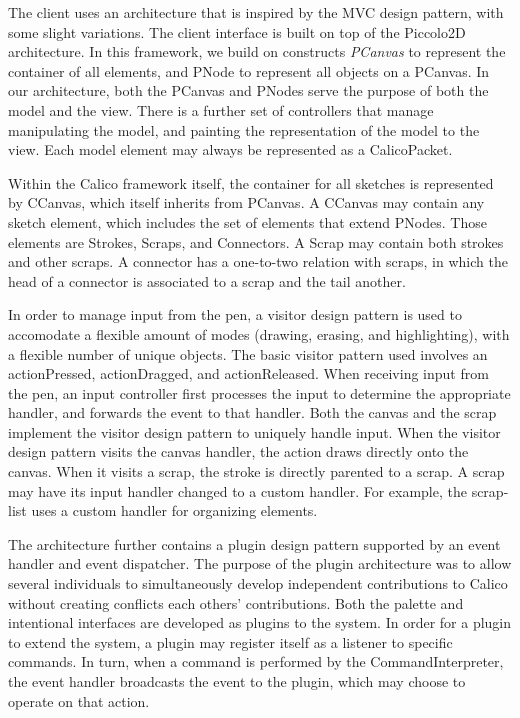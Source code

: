 \documentclass[12pt,fleqn]{ucithesis}
\begin{document}
The client uses an architecture that is inspired by the MVC design pattern, with some slight variations. The client interface is built on top of the Piccolo2D architecture. In this framework, we build on constructs \textit{PCanvas} to represent the container of all elements, and PNode to represent all objects on a PCanvas. In our architecture, both the PCanvas and PNodes serve the purpose of both the model and the view. There is a further set of controllers that manage manipulating the model, and painting the representation of the model to the view. Each model element may always be represented as a CalicoPacket. 

Within the Calico framework itself, the container for all sketches is represented by CCanvas, which itself inherits from PCanvas. A CCanvas may contain any sketch element, which includes the set of elements that extend PNodes. Those elements are Strokes, Scraps, and Connectors. A Scrap may contain both strokes and other scraps. A connector has a one-to-two relation with scraps, in which the head of a connector is associated to a scrap and the tail another.

In order to manage input from the pen, a visitor design pattern is used to accomodate a flexible amount of modes (drawing, erasing, and highlighting), with a flexible number of unique objects. The basic visitor pattern used involves an actionPressed, actionDragged, and actionReleased. When receiving input from the pen, an input controller first processes the input to determine the appropriate handler, and forwards the event to that handler. Both the canvas and the scrap implement the visitor design pattern to uniquely handle input. When the visitor design pattern visits the canvas handler, the action draws directly onto the canvas. When it visits a scrap, the stroke is directly parented to a scrap. A scrap may have its input handler changed to a custom handler. For example, the scrap-list uses a custom handler for organizing elements.

The architecture further contains a plugin design pattern supported by an event handler and event dispatcher. The purpose of the plugin architecture was to allow several individuals to simultaneously develop independent contributions to Calico without creating conflicts each others' contributions. Both the palette and intentional interfaces are developed as plugins to the system. In order for a plugin to extend the system, a plugin may register itself as a listener to specific commands. In turn, when a command is performed by the CommandInterpreter, the event handler broadcasts the event to the plugin, which may choose to operate on that action.
\end{document}
